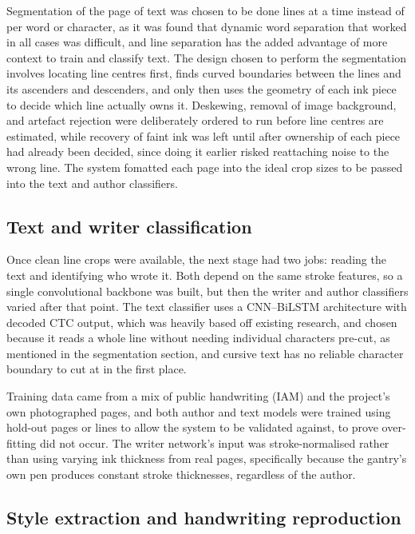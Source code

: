 Segmentation of the page of text was chosen to be done lines at a time instead of per word or character, as it was found that dynamic word separation that worked in all cases was difficult, and line separation has the added advantage of more context to train and classify text. The design chosen to perform the segmentation involves locating line centres first, finds curved boundaries between the lines and its ascenders and descenders, and only then uses the geometry of each ink piece to decide which line actually owns it. Deskewing, removal of image background, and artefact rejection were deliberately ordered to run before line centres are estimated, while recovery of faint ink was left until after ownership of each piece had already been decided, since doing it earlier risked reattaching noise to the wrong line. The system fomatted each page into the ideal crop sizes to be passed into the text and author classifiers.

\subsection{Text and writer classification}

Once clean line crops were available, the next stage had two jobs: reading the text and identifying who wrote it. Both depend on the same stroke features, so a single convolutional backbone was built, but then the writer and author classifiers varied after that point. The text classifier uses a CNN–BiLSTM architecture with decoded CTC output, which was heavily based off existing research, and chosen because it reads a whole line without needing individual characters pre-cut, as mentioned in the segmentation section, and cursive text has no reliable character boundary to cut at in the first place.

Training data came from a mix of public handwriting (IAM) and the project’s own photographed pages, and both author and text models were trained using hold-out pages or lines to allow the system to be validated against, to prove over-fitting did not occur. The writer network’s input was stroke-normalised rather than using varying ink thickness from real pages, specifically because the gantry’s own pen produces constant stroke thicknesses, regardless of the author.

\subsection{Style extraction and handwriting reproduction}

